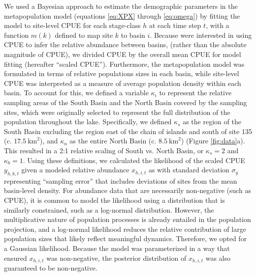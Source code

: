 \documentclass[11pt]{article}
\begin{document}
We used a Bayesian approach to estimate the demographic parameters in the metapopulation model
(equations \ref{eq:XPX} through \ref{eq:omega}) by fitting the model to site-level
CPUE for each stage-class $h$ at each time step $t$,
with a function $m(k)$ defined to map site $k$ to basin $i$.
Because were interested in using CPUE to infer the relative abundance between basins,
(rather than the absolute magnitude of CPUE),
we divided CPUE by the overall mean CPUE for model fitting (hereafter ``scaled CPUE'').
Furthermore, the metapopulation model was formulated in terms of
relative populations sizes in each basin,
while site-level CPUE was interpreted as a measure
of average population density within each basin.
To account for this, we defined a variable $\kappa_i$ to represent the relative
sampling areas of the South Basin and the North Basin covered by the sampling sites,
which were originally selected to represent the full distribution
of the population throughout the lake.
Specifically, we defined $\kappa_s$ as the region of the South Basin excluding the region
east of the chain of islands and south of site 135 (c. $17.5~\text{km}^2$),
and $\kappa_n$ as the entire North Basin (c. $8.5~\text{km}^2$) (Figure \ref{fig:data}a).
This resulted in a 2:1 relative scaling of South vs. North Basin,
or $\kappa_s = 2$ and $\kappa_b = 1$.
Using these definitions, we calculated the likelihood of the scaled CPUE $y_{h,k,t}$
given a modeled relative abundance $x_{h,i,t}$ as
%
%
with standard deviation $\sigma_y$ representing ``sampling error''
that includes deviations of sites from the mean basin-level density.
For abundance data that are necessarily non-negative (such as CPUE),
it is common to model the likelihood using a distribution that is similarly constrained,
such as a log-normal distribution.
However, the multiplicative nature of population processes is already entailed
in the population projection,
and a log-normal likelihood reduces the relative contribution of large population sizes
that likely reflect meaningful dynamics.
Therefore, we opted for a Gaussian likelihood.
Because the model was parameterized in a way that ensured
$x_{h,i,t}$ was non-negative,
the posterior distribution of $x_{h,i,t}$ was also guaranteed to be non-negative.
\end{document}
